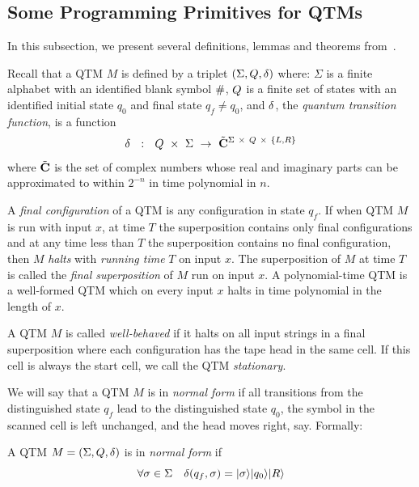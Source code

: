 \subsection{Some Programming Primitives for QTMs}

In this subsection, we present several definitions,
lemmas and theorems from~\cite{BV}.

Recall that a QTM $M$ is defined by a triplet
$(\Sigma,Q,{\delta})$ where:
$\Sigma$ is a finite alphabet with an identified blank symbol ${\#}$,
$Q$ is a finite set of states with an identified initial state $q_0$ and
final state $q_f \neq q_0$,
and ${\delta}$, the {\em quantum transition function},
is a function
\[\up\ \ :\ \ \states \ \times\ \Sigma\ \rightarrow\ \tilde{\C}^{\Sigma\ \times
 \ \states\ \times\ \dirs}\]
where $\tilde{{\bf C}}$ is the set of complex numbers whose real and
imaginary parts can be approximated to within $2^{-n}$ in time
polynomial in $n$.

\begin{definition} A {\em final configuration\/} of a QTM is any configuration
in state $q_f$.
If when QTM $M$ is run with input $x$, at time
$T$ the superposition contains only final configurations and at any
time less than $T$ the superposition contains no final configuration,
then $M$ {\em halts\/} with {\em running time\/} $T$ on input $x$.
The superposition of $M$ at time $T$ is called the {\em final superposition\/}
of $M$ run on input $x$.  A {polynomial-time\/} QTM is a well-formed
QTM which on every input $x$ halts in time
polynomial in the length of $x$.
\end{definition}

\begin{definition}
A QTM $M$ is called {\em well-behaved\/} if it halts on all input strings in
a final superposition where each configuration has the tape head in the same
cell.  If this cell is always the start cell, we call the QTM {\em stationary}.
\end{definition}

We will say that a QTM $M$ is in {\em normal form\/} if all transitions from
the distinguished state $q_f$ lead to the distinguished state $q_0$,
the symbol in the scanned cell is left unchanged, and the head moves
right, say. Formally:

\begin{definition}
A QTM
$M = (\Sigma, Q, \delta)$
is in {\em normal form\/} if
\[ \forall \sigma \in \Sigma\ \ \ \delta(q_f,\sigma) =
   {| \sigma \rangle}{| q_0 \rangle}{| R \rangle} \]
\end{definition}

